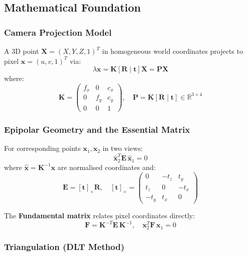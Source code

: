 \documentclass[12pt, a4paper]{article}
\begin{document}
\subsection{Mathematical Foundation}

\subsubsection{Camera Projection Model}

A 3D point $\mathbf{X} = (X, Y, Z, 1)^T$ in homogeneous world coordinates projects to pixel $\mathbf{x} = (u, v, 1)^T$ via:
\begin{equation}
  \lambda \mathbf{x} = \mathbf{K} [\mathbf{R} \mid \mathbf{t}] \mathbf{X} = \mathbf{P} \mathbf{X}
  \label{eq:projection}
\end{equation}
where:
\[
  \mathbf{K} = \begin{pmatrix} f_x & 0 & c_x \\ 0 & f_y & c_y \\ 0 & 0 & 1 \end{pmatrix}, \quad
  \mathbf{P} = \mathbf{K}[\mathbf{R} \mid \mathbf{t}] \in \mathbb{R}^{3 \times 4}
\]

\subsubsection{Epipolar Geometry and the Essential Matrix}

For corresponding points $\mathbf{x}_1, \mathbf{x}_2$ in two views:
\begin{equation}
  \hat{\mathbf{x}}_2^T \mathbf{E}\, \hat{\mathbf{x}}_1 = 0
  \label{eq:epipolar}
\end{equation}
where $\hat{\mathbf{x}} = \mathbf{K}^{-1}\mathbf{x}$ are normalised coordinates and:
\[
  \mathbf{E} = [\mathbf{t}]_\times \mathbf{R}, \quad
  [\mathbf{t}]_\times = \begin{pmatrix} 0 & -t_z & t_y \\ t_z & 0 & -t_x \\ -t_y & t_x & 0 \end{pmatrix}
\]

The \textbf{Fundamental matrix} relates pixel coordinates directly:
\[
  \mathbf{F} = \mathbf{K}^{-T} \mathbf{E}\, \mathbf{K}^{-1}, \quad \mathbf{x}_2^T \mathbf{F}\, \mathbf{x}_1 = 0
\]

\subsubsection{Triangulation (DLT Method)}
\end{document}
